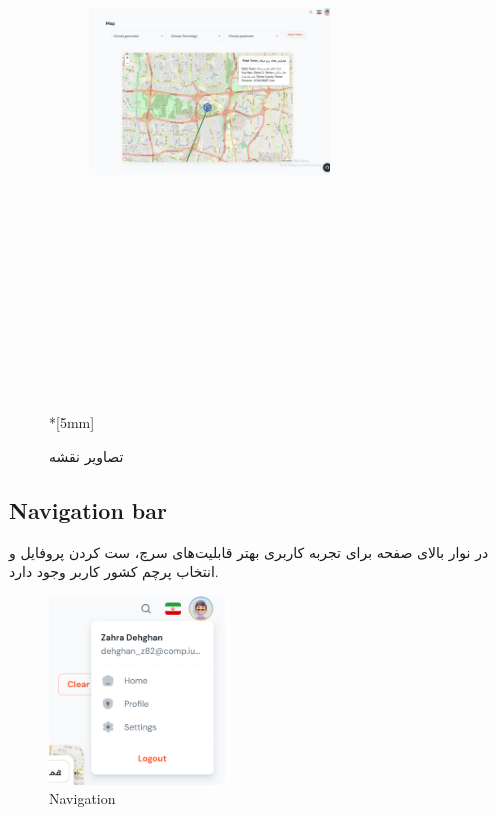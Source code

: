 \documentclass{report}
\begin{document}
\begin{figure}[h]
\begin{subfigure}[b]{0.4\textwidth}
		\includegraphics[width=0.7\textwidth,height=15cm,keepaspectratio]{Pic/map2}
		\label{fig:map2}
	\end{subfigure}\\*[5mm]
	\caption{تصاویر نقشه}
	\label{fig:mapsPic}
\end{figure}
\subsection{Navigation bar}
در نوار بالای صفحه برای تجربه کاربری بهتر قابلیت‌های سرچ، ست کردن پروفایل و انتخاب پرچم کشور کاربر وجود دارد.
\begin{figure}[ht]
	\centering
	\includegraphics[height=5cm,keepaspectratio]{Pic/nav_menu}
	\caption{Navigation}
	\label{fig:nav}
\end{figure}
\end{document}
